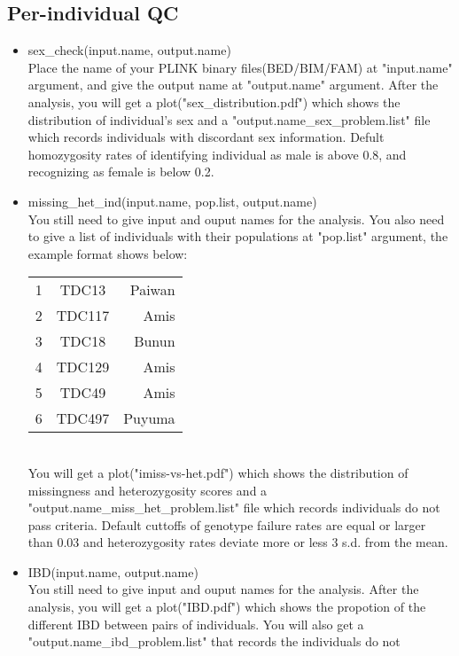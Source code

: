 \documentclass{article}
\begin{document}
\subsection{Per-individual QC}
\begin{itemize}
    \item sex\_check(input.name, output.name) \\
    Place the name of your PLINK binary files(BED/BIM/FAM) at "input.name" argument, and give the output name at "output.name" argument.
    After the analysis, you will get a plot("sex\_distribution.pdf") which shows the distribution of individual's sex and a 
    "output.name\_sex\_problem.list" file which records individuals with discordant sex information. Defult homozygosity rates of identifying 
    individual as male is above 0.8, and recognizing as female is below 0.2.
    \item missing\_het\_ind(input.name, pop.list, output.name) \\
    You still need to give input and ouput names for the analysis. You also need to give a list of individuals with their populations at "pop.list" argument, 
    the example format shows below:\\
    \begin{table}[ht]
    \centering
    \begin{tabular}{lcr}
    \hline
    1 & TDC13 & Paiwan \\ 
    2 & TDC117 & Amis \\ 
    3 & TDC18 & Bunun \\ 
    4 & TDC129 & Amis \\
    5 & TDC49 & Amis \\
    6 & TDC497 & Puyuma \\
    \hline
    \end{tabular}
    \end{table}\\
    You will get a plot("imiss-vs-het.pdf") which shows the distribution of missingness and heterozygosity scores and a 
    "output.name\_miss\_het\_problem.list" file which records individuals do not pass criteria. Default cuttoffs of genotype failure rates 
    are equal or larger than 0.03 and heterozygosity rates deviate more or less 3 s.d. from the mean.
    \item IBD(input.name, output.name) \\
    You still need to give input and ouput names for the analysis. After the analysis, you will get a plot("IBD.pdf") which shows the propotion 
    of the different IBD between pairs of individuals. You will also get a "output.name\_ibd\_problem.list" that records the individuals do not 

\end{itemize}
\end{document}
